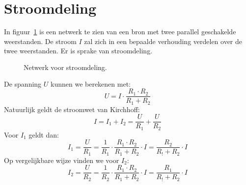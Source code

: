 \section{Stroomdeling}
In figuur~\ref{fig:gelstroomdeling} is een netwerk te zien van een bron met twee parallel
geschakelde weerstanden. De stroom $I$ zal zich in een bepaalde verhouding
verdelen over de twee weerstanden. Er is sprake van stroomdeling.

\begin{figure}[!ht]
\centering
{}
\caption{Netwerk voor stroomdeling.}
\label{fig:gelstroomdeling}
\end{figure}

De spanning $U$ kunnen we berekenen met:
%
\begin{equation}
U = I\cdot\dfrac{R_1\cdot R_2}{R_1+R_2}
\end{equation}
%
Natuurlijk geldt de stroomwet van Kirchhoff:
%
\begin{equation}
I = I_1 + I_2 = \dfrac{U}{R_1} + \dfrac{U}{R_2}
\end{equation}
%
Voor $I_1$ geldt dan:
%
\begin{equation}
I_1 = \dfrac{U}{R_1} = \dfrac{1}{R_1}\cdot\dfrac{R_1\cdot R_2}{R_1+R_2}\cdot I = \dfrac{R_2}{R_!+R_2}\cdot I
\end{equation}
%
Op vergelijkbare wijze vinden we voor $I_2$:
%
\begin{equation}
I_2 = \dfrac{U}{R_2} = \dfrac{1}{R_2}\cdot\dfrac{R_1\cdot R_2}{R_1+R_2}\cdot I = \dfrac{R_1}{R_!+R_2}\cdot I
\end{equation}

